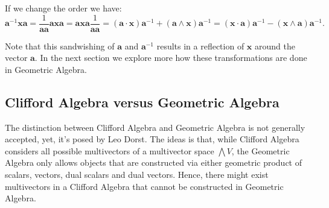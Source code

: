 If we change the order we have:
\begin{displaymath}
    \mathbf a^{-1} \mathbf x \mathbf a = 
    \frac{1}{\mathbf a \mathbf a}\mathbf a \mathbf x \mathbf a = 
    \mathbf a\mathbf x \mathbf a \frac{1}{\mathbf a \mathbf a}
    = (\mathbf a \cdot \mathbf x) \mathbf a^{-1} + (\mathbf a \wedge \mathbf x) \mathbf a^{-1}
    = (\mathbf x \cdot \mathbf a) \mathbf a^{-1} - (\mathbf x \wedge \mathbf a) \mathbf a^{-1}.
\end{displaymath}

Note that this sandwishing of $\mathbf a$ and $\mathbf a^{-1}$ results in a reflection of 
$\mathbf x $ around the vector $\mathbf a$. In the next section we explore more how these
transformations are done in Geometric Algebra.

\subsection{Clifford Algebra versus Geometric Algebra}

The distinction between Clifford Algebra and Geometric Algebra is not generally accepted, yet, it's posed by
Leo Dorst. The ideas is that, while Clifford Algebra considers all possible multivectors of a multivector space $\bigwedge V$,
the Geometric Algebra only allows objects that are constructed via either geometric product of scalars, vectors, dual scalars and dual vectors.
Hence, there might exist multivectors in a Clifford Algebra that cannot be constructed in Geometric Algebra.



